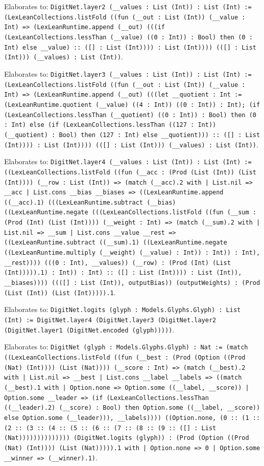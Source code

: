 \documentclass[11pt]{article}
\begin{document}
\noindent Elaborates to: \texttt{DigitNet.layer2 (\_\_values : List (Int)) : List (Int) := (LexLeanCollections.listFold ((fun (\_\_out : List (Int)) (\_\_value : Int) => (LexLeanRuntime.append (\_\_out) (((if (LexLeanCollections.lessThan (\_\_value) ((0 : Int)) : Bool) then (0 : Int) else \_\_value) :: ([] : List (Int)))) : List (Int)))) (([] : List (Int))) (\_\_values) : List (Int))}.\par
\noindent Elaborates to: \texttt{DigitNet.layer3 (\_\_values : List (Int)) : List (Int) := (LexLeanCollections.listFold ((fun (\_\_out : List (Int)) (\_\_value : Int) => (LexLeanRuntime.append (\_\_out) (((let \_\_quotient : Int := (LexLeanRuntime.quotient (\_\_value) ((4 : Int)) ((0 : Int)) : Int); (if (LexLeanCollections.lessThan (\_\_quotient) ((0 : Int)) : Bool) then (0 : Int) else (if (LexLeanCollections.lessThan ((127 : Int)) (\_\_quotient) : Bool) then (127 : Int) else \_\_quotient))) :: ([] : List (Int)))) : List (Int)))) (([] : List (Int))) (\_\_values) : List (Int))}.\par
\noindent Elaborates to: \texttt{DigitNet.layer4 (\_\_values : List (Int)) : List (Int) := ((LexLeanCollections.listFold ((fun (\_\_acc : (Prod (List (Int)) (List (Int)))) (\_\_row : List (Int)) => (match (\_\_acc).2 with | List.nil => \_\_acc | List.cons \_\_bias \_\_biases => ((LexLeanRuntime.append ((\_\_acc).1) (((LexLeanRuntime.subtract (\_\_bias) ((LexLeanRuntime.negate (((LexLeanCollections.listFold ((fun (\_\_sum : (Prod (Int) (List (Int)))) (\_\_weight : Int) => (match (\_\_sum).2 with | List.nil => \_\_sum | List.cons \_\_value \_\_rest => ((LexLeanRuntime.subtract ((\_\_sum).1) ((LexLeanRuntime.negate ((LexLeanRuntime.multiply (\_\_weight) (\_\_value) : Int)) : Int)) : Int), \_\_rest)))) (((0 : Int), \_\_values)) (\_\_row) : (Prod (Int) (List (Int))))).1) : Int)) : Int) :: ([] : List (Int)))) : List (Int)), \_\_biases)))) ((([] : List (Int)), outputBias)) (outputWeights) : (Prod (List (Int)) (List (Int))))).1}.\par
\noindent Elaborates to: \texttt{DigitNet.logits (glyph : Models.Glyphs.Glyph) : List (Int) := DigitNet.layer4 (DigitNet.layer3 (DigitNet.layer2 (DigitNet.layer1 (DigitNet.encoded (glyph)))))}.\par
\noindent Elaborates to: \texttt{DigitNet (glyph : Models.Glyphs.Glyph) : Nat := (match ((LexLeanCollections.listFold ((fun (\_\_best : (Prod (Option ((Prod (Nat) (Int)))) (List (Nat)))) (\_\_score : Int) => (match (\_\_best).2 with | List.nil => \_\_best | List.cons \_\_label \_\_labels => ((match (\_\_best).1 with | Option.none => Option.some ((\_\_label, \_\_score)) | Option.some \_\_leader => (if (LexLeanCollections.lessThan ((\_\_leader).2) (\_\_score) : Bool) then Option.some ((\_\_label, \_\_score)) else Option.some (\_\_leader))), \_\_labels)))) ((Option.none, (0 :: (1 :: (2 :: (3 :: (4 :: (5 :: (6 :: (7 :: (8 :: (9 :: ([] : List (Nat)))))))))))))) (DigitNet.logits (glyph)) : (Prod (Option ((Prod (Nat) (Int)))) (List (Nat))))).1 with | Option.none => 0 | Option.some \_\_winner => (\_\_winner).1)}.\par
\end{document}
